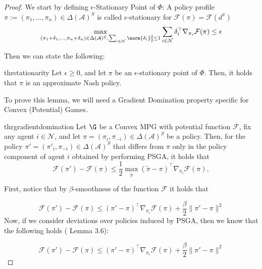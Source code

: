 \begin{proof}
We start by defining $\epsilon$-Stationary Point of $\Phi$:
A policy profile $\pi := (\pi_1,...,\pi_n) \in \Delta(\mathcal{A})^S$ is called $\epsilon$-stationary for $\mathcal F(\pi) = \mathcal F(d^\pi)$ 
\begin{equation}     \max_{(\pi_1 + \delta_1,\dots,\pi_n+\delta_n) \in \Delta(\mathcal{A})^S,  \sum_{i \in \mathcal{N}}\norm{\delta_i}^2_2 \leq 1 } \sum_{i \in \mathcal{N}} \delta_i^{\top} \nabla_{\pi_i} \mathcal F(\pi) \leq \epsilon \end{equation} 

Then we can state the following:
\begin{restatable}{thr}{stationarity}
\label{thr:stationarity}
 Let $\epsilon \geq 0$, and let $\pi$ be an $\epsilon$-stationary point of $\Phi$. Then, it holds that $\pi$ is an approximate Nash policy.
\end{restatable}

To prove this lemma, we will need a Gradient Domination property specific for Convex (Potential) Games.

\begin{restatable}{thr}{gradientdomination}
Let $\G$ be a Convex MPG with potential function $\mathcal F$, fix any agent $i \in \mathcal{N}$, and let $\pi=(\pi_i,\pi_{-i})\in \Delta(\mathcal A)^S$ be a policy. Then, for the policy $\pi'=(\pi'_i,\pi_{-i}) \in \Delta(\mathcal A)^S$ that differs from $\pi$ only in the policy component of agent $i$ obtained by performing PSGA, it holds that
\begin{equation}
\mathcal F(\pi')-\mathcal F(\pi)\le \frac{1}{2}\max_{\tilde \pi}(\tilde \pi-\pi)^\top \nabla_{\pi_i}\mathcal F(\pi),
\end{equation}
\end{restatable}

First, notice that by $\beta$-smoothness of the function $\mathcal F$ it holds that

\begin{equation}
    \mathcal F(\pi')-\mathcal F(\pi)\le ( \pi'-\pi)^\top \nabla_{\pi_i}\mathcal F(\pi) + \frac{\beta}{2}\|\pi' - \pi\|^2
\end{equation}
Now, if we consider deviations over policies induced by PSGA, then we know that the following holds (\cite{bubeck2015convexoptimizationalgorithmscomplexity} Lemma 3.6):

\begin{equation}
    \mathcal F(\pi')-\mathcal F(\pi)\le ( \pi'-\pi)^\top \nabla_{\pi_i}\mathcal F(\pi) + \frac{\beta}{2}\|\pi' - \pi\|^2
\end{equation}


\end{proof}
